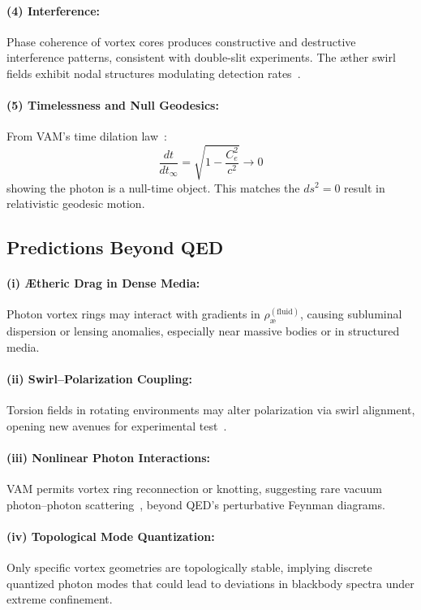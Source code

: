 \paragraph{(4) Interference:}
Phase coherence of vortex cores produces constructive and destructive interference patterns, consistent with double-slit experiments. The æther swirl fields exhibit nodal structures modulating detection rates~\cite{VAM-2}.

\paragraph{(5) Timelessness and Null Geodesics:}
From VAM’s time dilation law~\cite{VAM-1}:
\begin{equation}
    \frac{dt}{dt_\infty} = \sqrt{1 - \frac{C_e^2}{c^2}} \to 0
\end{equation}
showing the photon is a null-time object. This matches the $ds^2 = 0$ result in relativistic geodesic motion.

\subsection{Predictions Beyond QED}

\paragraph{(i) Ætheric Drag in Dense Media:}
Photon vortex rings may interact with gradients in $\rho_\text{\ae}^{(\text{fluid})}$, causing subluminal dispersion or lensing anomalies, especially near massive bodies or in structured media.

\paragraph{(ii) Swirl–Polarization Coupling:}
Torsion fields in rotating environments may alter polarization via swirl alignment, opening new avenues for experimental test~\cite{fedi2023, vanputten2022}.

\paragraph{(iii) Nonlinear Photon Interactions:}
VAM permits vortex ring reconnection or knotting, suggesting rare vacuum photon–photon scattering~\cite{battye1998}, beyond QED’s perturbative Feynman diagrams.

\paragraph{(iv) Topological Mode Quantization:}
Only specific vortex geometries are topologically stable, implying discrete quantized photon modes that could lead to deviations in blackbody spectra under extreme confinement.


